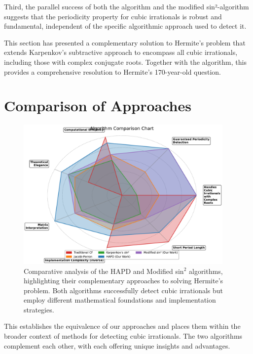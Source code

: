 Third, the parallel success of both the \HAPD{} algorithm and the modified sin²-algorithm suggests that the periodicity property for cubic irrationals is robust and fundamental, independent of the specific algorithmic approach used to detect it.

This section has presented a complementary solution to Hermite's problem that extends Karpenkov's subtractive approach to encompass all cubic irrationals, including those with complex conjugate roots. Together with the \HAPD{} algorithm, this provides a comprehensive resolution to Hermite's 170-year-old question.

\section{Comparison of Approaches}\label{sec:comparison}

\begin{figure}[ht]
\centering
\includegraphics[width=0.95\textwidth]{figures/output/algorithm_comparison_chart.pdf}
\caption{Comparative analysis of the HAPD and Modified sin$^2$ algorithms, highlighting their complementary approaches to solving Hermite's problem. Both algorithms successfully detect cubic irrationals but employ different mathematical foundations and implementation strategies.}
\label{fig:algorithm_approaches_comparison}
\end{figure}

This establishes the equivalence of our approaches and places them within the broader context of methods for detecting cubic irrationals. The two algorithms complement each other, with each offering unique insights and advantages. 